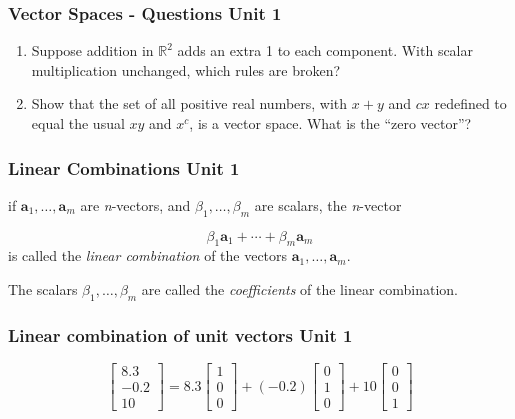 \documentclass[12pt]{beamer}
\newcommand{\FrameTitle}[2]{\frametitle{#1 \hfill \small\textnormal{\textcolor{midgray}{#2}}}}
\newcommand{\nl}{\vspace*{1em}\\}
\newcommand{\vsp}{\vspace*{1em}}
\newcommand{\Vector}[1]{\textbf{#1}}
\begin{document}
\begin{frame}\FrameTitle{Vector Spaces - Questions}{Unit 1}
    \vsp
    \begin{enumerate}
    \item {\textcolor{question}{
        Suppose addition in $\mathbb{R}^2$ adds an extra 1 to each component.
        With scalar multiplication unchanged, which rules are broken?
    }}
    \nl
    \item {\textcolor{question}{
        Show that the set of all positive real numbers, with $x + y$ and $cx$ redefined to
        equal the usual $xy$ and $x^c$, is a vector space. What is the ``zero vector''?
    }}
    \end{enumerate}
\end{frame}


\begin{frame}\FrameTitle{Linear Combinations}{Unit 1}
    if $\Vector{a}_1, \ldots, \Vector{a}_m$ are \emph{n}-vectors, and $\beta_1,\ldots,\beta_m$ are scalars,
    the \emph{n}-vector

    \[
        \beta_1 \Vector{a}_1 + \cdots + \beta_m \Vector{a}_m
    \]
    is called the \emph{linear combination} of the vectors $\Vector{a}_1,\ldots,\Vector{a}_m$.

    \vsp

    The scalars $\beta_1,\ldots,\beta_m$ are called the \emph{coefficients}
    of the linear combination.
\end{frame}

\begin{frame}\FrameTitle{Linear combination of unit vectors}{Unit 1}
    \[
        \begin{bmatrix}
            8.3 \\
            -0.2 \\
            10
        \end{bmatrix} =
        8.3 \begin{bmatrix}
            1 \\
            0 \\
            0
        \end{bmatrix} +
        (-0.2)\begin{bmatrix}
            0 \\
            1 \\
            0
        \end{bmatrix} +
        10\begin{bmatrix}
            0 \\
            0 \\
            1
        \end{bmatrix}
    \]
\end{frame}
\end{document}
